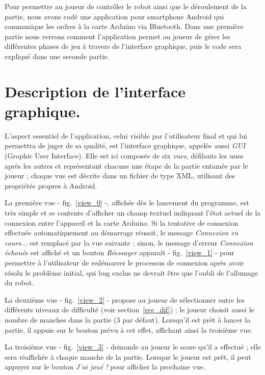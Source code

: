 Pour permettre au joueur de contrôler le robot ainsi que le déroulement de la partie, nous avons codé une application pour smartphone Android qui communique les ordres à la carte Arduino via Bluetooth. Dans une première partie nous verrons comment l'application permet au joueur de gérer les différentes phases de jeu à travers de l'interface graphique, puis le code sera expliqué dans une seconde partie.

\section{Description de l'interface graphique.}

\label{andr_gui}

\graphicspath{{rc/images/android/}}

L’aspect essentiel de l’application, celui visible par l’utilisateur final et qui lui permettra de juger de sa qualité, est l’interface graphique, appelée aussi \emph{GUI} (Graphic User Interface). Elle est ici composée de six \emph{vues}, défilants les unes après les autres et représentant chacune une étape de la partie entamée par le joueur ; chaque vue est décrite dans un fichier de type XML, utilisant des propriétés propres à Android.

La première vue - fig.~\ref{view_0} -, affichée dès le lancement du programme, est très simple et se contente d’afficher un champ textuel indiquant l’état actuel de la connexion entre l’appareil et la carte Arduino. Si la tentative de connexion effectuée automatiquement au démarrage réussit, le message \emph{Connexion en cours...} est remplacé par la vue suivante ; sinon, le message d’erreur \emph{Connexion échouée} est affiché et un bouton \emph{Réessayer} apparaît - fig.~\ref{view_1} - pour permettre à l’utilisateur de redémarrer le processus de connexion après avoir résolu le problème initial, qui bug exclus ne devrait être que l’oubli de l’allumage du robot.

La deuxième vue - fig.~\ref{view_2} - propose au joueur de sélectionner entre les différents niveaux de difficulté (voir section~\ref{reg_dif}) ; le joueur choisit aussi le nombre de manches dans la partie (3 par défaut). Lorsqu’il est prêt à lancer la partie, il appuie sur le bouton prévu à cet effet, affichant ainsi la troisième vue.

La troisième vue - fig.~\ref{view_3} - demande au joueur le score qu’il a effectué ; elle sera réaffichée à chaque manche de la partie. Lorsque le joueur est prêt, il peut appuyer sur le bouton \emph{J’ai joué !} pour afficher la prochaine vue.

